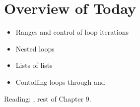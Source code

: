 \documentclass[letterpaper,10pt,english]{sphinxmanual}
\begin{document}
\section{Overview of Today}
\label{\detokenize{lecture_notes/lec12_loops2_for_double:overview-of-today}}\begin{itemize}
\item {} 
Ranges and control of loop iterations

\item {} 
Nested loops

\item {} 
Lists of lists

\item {} 
Contolling loops through  and 

\end{itemize}

Reading: , rest of Chapter 9.
\end{document}
